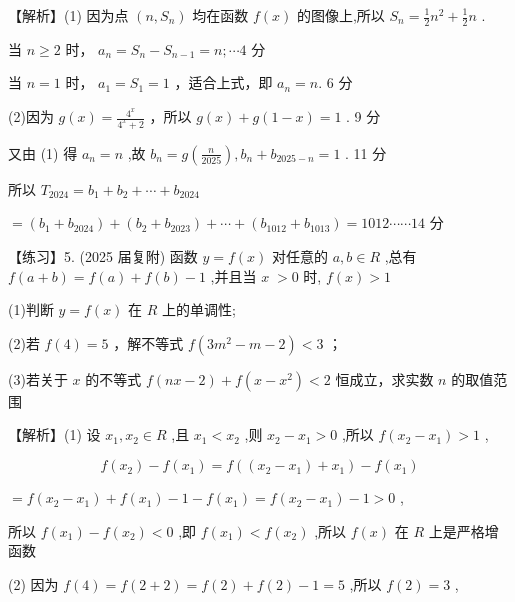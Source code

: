 \documentclass[10pt]{article}
\begin{document}
【解析】(1) 因为点 \(\left( {n,{S}_{n}}\right)\) 均在函数 \(f\left( x\right)\) 的图像上,所以 \({S}_{n} = \frac{1}{2}{n}^{2} + \frac{1}{2}n\) .

当 \(n \geq  2\) 时， \({a}_{n} = {S}_{n} - {S}_{n - 1} = n;\cdots 4\) 分

当 \(n = 1\) 时， \({a}_{1} = {S}_{1} = 1\) ，适合上式，即 \({a}_{n} = n.\) 6 分

(2)因为 \(g\left( x\right)  = \frac{{4}^{x}}{{4}^{x} + 2}\) ，所以 \(g\left( x\right)  + g\left( {1 - x}\right)  = 1\) . 9 分

又由 (1) 得 \({a}_{n} = n\) ,故 \({b}_{n} = g\left( \frac{n}{2025}\right) ,{b}_{n} + {b}_{{2025} - n} = 1\) . 11 分

所以 \({T}_{2024} = {b}_{1} + {b}_{2} + \cdots  + {b}_{2024}\)

\(= \left( {{b}_{1} + {b}_{2024}}\right)  + \left( {{b}_{2} + {b}_{2023}}\right)  + \cdots  + \left( {{b}_{1012} + {b}_{1013}}\right)  = {1012}\cdots \cdots {14}\) 分

【练习】5. (2025 届复附) 函数 \(y = f\left( x\right)\) 对任意的 \(a,b \in  R\) ,总有 \(f\left( {a + b}\right)  = f\left( a\right)  + f\left( b\right)  - 1\) ,并且当 \(x \; > 0\) 时, \(f\left( x\right)  > 1\)

(1)判断 \(y = f\left( x\right)\) 在 \(R\) 上的单调性;

(2)若 \(f\left( 4\right)  = 5\) ，解不等式 \(f\left( {3{m}^{2} - m - 2}\right)  < 3\) ；

(3)若关于 \(x\) 的不等式 \(f\left( {{nx} - 2}\right)  + f\left( {x - {x}^{2}}\right)  < 2\) 恒成立，求实数 \(n\) 的取值范围

【解析】(1) 设 \({x}_{1},{x}_{2} \in  R\) ,且 \({x}_{1} < {x}_{2}\) ,则 \({x}_{2} - {x}_{1} > 0\) ,所以 \(f\left( {{x}_{2} - {x}_{1}}\right)  > 1\) ,

\[
f\left( {x}_{2}\right)  - f\left( {x}_{1}\right)  = f\left( {\left( {{x}_{2} - {x}_{1}}\right)  + {x}_{1}}\right)  - f\left( {x}_{1}\right)
\]

\(= f\left( {{x}_{2} - {x}_{1}}\right)  + f\left( {x}_{1}\right)  - 1 - f\left( {x}_{1}\right)  = f\left( {{x}_{2} - {x}_{1}}\right)  - 1 > 0\) ,

所以 \(f\left( {x}_{1}\right)  - f\left( {x}_{2}\right)  < 0\) ,即 \(f\left( {x}_{1}\right)  < f\left( {x}_{2}\right)\) ,所以 \(f\left( x\right)\) 在 \(R\) 上是严格增函数

(2) 因为 \(f\left( 4\right)  = f\left( {2 + 2}\right)  = f\left( 2\right)  + f\left( 2\right)  - 1 = 5\) ,所以 \(f\left( 2\right)  = 3\) ,
\end{document}
